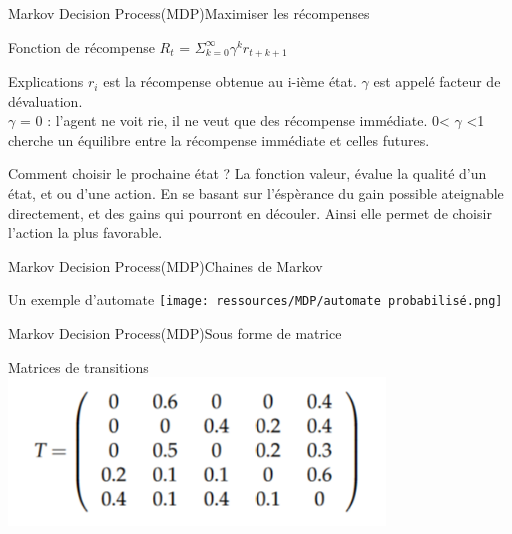 \begin{frame}{Markov Decision Process(MDP)}{Maximiser les récompenses}
	\begin{center}
		
		\begin{block}{Fonction de récompense}
			$R_t$ = $\Sigma^{\infty}_{k=0}$$\gamma^{k}r_{t+k+1}$
		\end{block}
		\begin{block}{Explications}
			$r_{i}$ est la récompense obtenue au i-ième état.
			$\gamma$ est appelé facteur de dévaluation.\\
			$\gamma$ = 0 : l'agent ne voit rie, il ne veut que des récompense immédiate.
			0< $\gamma$ <1 cherche un équilibre entre la récompense immédiate et celles futures.
		\end{block}
		\begin{block}{Comment choisir le prochaine état ?}
			La fonction valeur, évalue la qualité d’un état, et ou d’une action. En se basant sur l’éspèrance du gain possible ateignable directement, et des gains qui pourront en découler. Ainsi elle permet de choisir l’action la plus favorable.
		\end{block}
	\end{center}
\end{frame}
\begin{frame}{Markov Decision Process(MDP)}{Chaines de Markov}
	\begin{center}
		
		\begin{center}{Un exemple d'automate}
			\texttt{[image: ressources/MDP/automate probabilisé.png]}
		\end{center}
	\end{center}
\end{frame}
\begin{frame}{Markov Decision Process(MDP)}{Sous forme de matrice}
	\begin{center}
		\begin{center}{Matrices de transitions}
			\includegraphics[width=10cm]{ressources/MDP/Matrice de transitions.png}
		\end{center}
	\end{center}
\end{frame}
